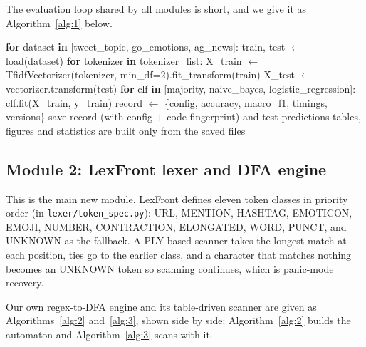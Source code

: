 \documentclass[journal,onecolumn,12pt,a4paper]{IEEEtran}
\begin{document}
The evaluation loop shared by all modules is short, and we give it as Algorithm~\ref{alg:1} below.

\begin{algorithm}[!t]
\footnotesize
\caption{Evaluation loop shared by all modules}\label{alg:1}
\begin{algorithmic}[1]
\State \textbf{for} dataset \textbf{in} [tweet\_topic, go\_emotions, ag\_news]:
\State \hspace*{1.0em}train, test $\leftarrow$ load(dataset)
\State \hspace*{1.0em}\textbf{for} tokenizer \textbf{in} tokenizer\_list:
\State \hspace*{2.0em}X\_train $\leftarrow$ TfidfVectorizer(tokenizer, min\_df=2).fit\_transform(train)
\State \hspace*{2.0em}X\_test  $\leftarrow$ vectorizer.transform(test)
\State \hspace*{2.0em}\textbf{for} clf \textbf{in} [majority, naive\_bayes, logistic\_regression]:
\State \hspace*{3.0em}clf.fit(X\_train, y\_train)
\State \hspace*{3.0em}record $\leftarrow$ \{config, accuracy, macro\_f1, timings, versions\}
\State \hspace*{3.0em}save record (with config + code fingerprint) and test predictions
\State tables, figures and statistics are built only from the saved files
\end{algorithmic}
\end{algorithm}

\subsection{Module 2: LexFront lexer and DFA engine}\label{sec:3.4}
This is the main new module. LexFront defines eleven token classes in priority order (in \texttt{lexer/\allowbreak{}token\_\allowbreak{}spec.py}): URL, MENTION, HASHTAG, EMOTICON, EMOJI, NUMBER, CONTRACTION, ELONGATED, WORD, PUNCT, and UNKNOWN as the fallback. A PLY-based scanner takes the longest match at each position, ties go to the earlier class, and a character that matches nothing becomes an UNKNOWN token so scanning continues, which is panic-mode recovery.

Our own regex-to-DFA engine and its table-driven scanner are given as Algorithms~\ref{alg:2} and~\ref{alg:3}, shown side by side: Algorithm~\ref{alg:2} builds the automaton and Algorithm~\ref{alg:3} scans with it.
\end{document}
